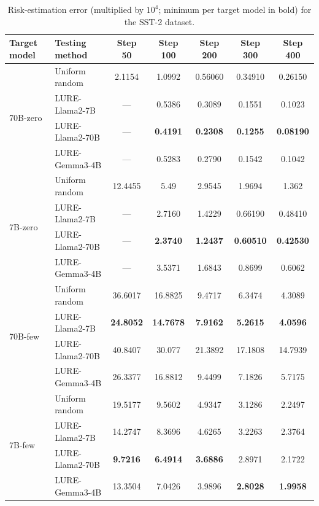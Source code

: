 \begin{table}[h]
    \centering
    \small
    \begin{tabular}{l l c c c c c}
        \toprule
        Target model & Testing method & Step 50 & Step 100 & Step 200 & Step 300 & Step 400 \\
        \midrule
        \multirow{4}{*}{70B-zero}& Uniform random & 2.1154 &  1.0992 &  0.56060 &  0.34910  & 0.26150 \\
        & LURE-Llama2-7B & --- & 0.5386 &  0.3089 &  0.1551 &  0.1023  \\
        & LURE-Llama2-70B & --- & \textbf{0.4191}  & \textbf{0.2308} &  \textbf{0.1255 } & \textbf{0.08190} \\
        & LURE-Gemma3-4B & --- & 0.5283& 0.2790 & 0.1542& 0.1042 \\
        \hline
        \multirow{4}{*}{7B-zero}& Uniform random &12.4455&  5.49 &   2.9545&  1.9694&  1.362 \\
        & LURE-Llama2-7B & --- & 2.7160  & 1.4229 &  0.66190 &  0.48410 \\
        & LURE-Llama2-70B & --- & \textbf{2.3740}  & \textbf{1.2437}  & \textbf{0.60510}  & \textbf{0.42530 } \\
        &LURE-Gemma3-4B & --- & 3.5371 & 1.6843& 0.8699& 0.6062\\
        \hline
        \multirow{4}{*}{70B-few}& Uniform random & 36.6017& 16.8825 &9.4717&  6.3474&  4.3089 \\
        &LURE-Llama2-7B  & \textbf{24.8052}&  \textbf{14.7678}&   \textbf{7.9162} & \textbf{5.2615} & \textbf{4.0596} \\
        & LURE-Llama2-70B  & 40.8407&  30.077 &  21.3892 & 17.1808 & 14.7939 \\
        &LURE-Gemma3-4B & 26.3377& 16.8812& 9.4499& 7.1826 & 5.7175\\
        \hline
        \multirow{4}{*}{7B-few}& Uniform random & 19.5177&  9.5602 & 4.9347&  3.1286 & 2.2497 \\
        &LURE-Llama2-7B &14.2747&  8.3696&  4.6265&  3.2263 & 2.3764 \\
        &LURE-Llama2-70B & \textbf{9.7216}&  \textbf{6.4914} & \textbf{3.6886}& 2.8971&  2.1722 \\
        &LURE-Gemma3-4B & 13.3504& 7.0426& 3.9896& \textbf{2.8028}&\textbf{1.9958}\\
        \bottomrule
    \end{tabular}
    \vspace{1em}
    \caption{
        Risk-estimation error (multiplied by $10^4$; minimum per target model in bold) for the SST-2 dataset.
    }
    \label{tab:2}
\end{table}


